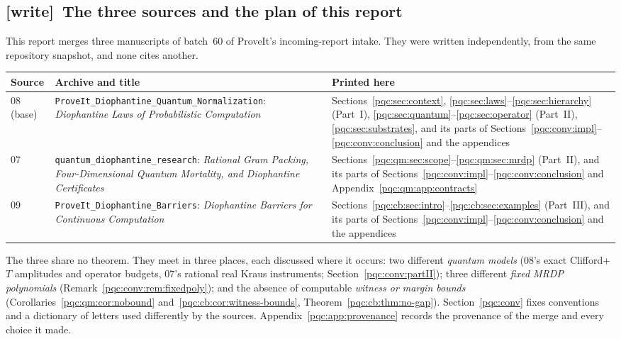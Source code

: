 \documentclass[11pt,letterpaper]{article}
\numberwithin{equation}{section}
\theoremstyle{definition}
\theoremstyle{remark}
\newcommand{\code}[1]{\nolinkurl{#1}}
\newcommand{\wtag}{\textup{[write]}}
\begin{document}
\subsection{\wtag\ The three sources and the plan of this report}
\label{pqc:conv:sources}
This report merges three manuscripts of batch~60 of ProveIt's
incoming-report intake. They were written independently, from the same
repository snapshot, and none cites another.

\begin{center}
\small
\begin{tabular}{@{}p{}p{}p{}@{}}
\toprule
Source & Archive and title & Printed here\\
\midrule
08 (base) & \code{ProveIt_Diophantine_Quantum_Normalization}: \emph{Diophantine
Laws of Probabilistic Computation} &
Sections~\ref{pqc:sec:context}, \ref{pqc:sec:laws}--\ref{pqc:sec:hierarchy}
(Part~I), \ref{pqc:sec:quantum}--\ref{pqc:sec:operator} (Part~II),
\ref{pqc:sec:substrates}, and its parts of
Sections~\ref{pqc:conv:impl}--\ref{pqc:conv:conclusion} and the
appendices\\[3pt]
07 & \code{quantum_diophantine_research}: \emph{Rational Gram Packing,
Four-Dimensional Quantum Mortality, and Diophantine Certificates} &
Sections~\ref{pqc:qm:sec:scope}--\ref{pqc:qm:sec:mrdp} (Part~II), and its
parts of Sections~\ref{pqc:conv:impl}--\ref{pqc:conv:conclusion} and
Appendix~\ref{pqc:qm:app:contracts}\\[3pt]
09 & \code{ProveIt_Diophantine_Barriers}: \emph{Diophantine Barriers for
Continuous Computation} &
Sections~\ref{pqc:cb:sec:intro}--\ref{pqc:cb:sec:examples} (Part~III), and
its parts of Sections~\ref{pqc:conv:impl}--\ref{pqc:conv:conclusion} and the
appendices\\
\bottomrule
\end{tabular}
\end{center}

The three share no theorem. They meet in three places, each discussed where
it occurs: two different \emph{quantum models} (08's exact Clifford+$T$
amplitudes and operator budgets, 07's rational real Kraus instruments;
Section~\ref{pqc:conv:partII}); three different \emph{fixed MRDP polynomials}
(Remark~\ref{pqc:conv:rem:fixedpoly}); and the absence of computable
\emph{witness or margin bounds} (Corollaries~\ref{pqc:qm:cor:nobound}
and~\ref{pqc:cb:cor:witness-bounds}, Theorem~\ref{pqc:cb:thm:no-gap}).
Section~\ref{pqc:conv} fixes conventions and a dictionary of letters used
differently by the sources. Appendix~\ref{pqc:app:provenance} records the
provenance of the merge and every choice it made.
\end{document}
